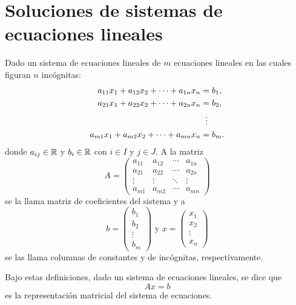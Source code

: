 \documentclass[a4,11pt]{aleph-notas}
\begin{document}
\encabezado

\section{Soluciones de sistemas de ecuaciones lineales}
\begin{defi}
    Dado un sistema de ecuaciones lineales de $m$ ecuaciones lineales en las cuales figuran $n$ incógnitas:
    \begin{align*}
        a_{11}x_1 + a_{12}x_2 + \cdots + a_{1n}x_n &= b_1,\\
        a_{21}x_1 + a_{22}x_2 + \cdots + a_{2n}x_n &= b_2,\\
            & \hspace{2mm} \vdots\\
        a_{m1}x_1 + a_{m2}x_2 + \cdots + a_{mn}x_n &= b_m.
    \end{align*}
    donde $a_{ij}\in\mathbb{R}$ y $b_i\in \mathbb{R}$ con $i\in I$ y $j\in J$. A la matriz
    \[
        A=\begin{pmatrix}
        a_{11} & a_{12} & \cdots & a_{1n}\\
        a_{21} & a_{22} & \cdots & a_{2n}\\
        \vdots & \vdots & \ddots & \vdots\\
        a_{m1} & a_{m2} & \cdots & a_{mn}
        \end{pmatrix}
    \]
    se la llama matriz de coeficientes del sistema y a 
    \[
        b=\begin{pmatrix}
        b_1 \\ b_2 \\ \vdots \\ b_m
        \end{pmatrix}
        \text{ y }
        x=\begin{pmatrix}
        x_1 \\ x_2 \\ \vdots \\ x_n
        \end{pmatrix}
    \]
    se las llama columnas de constantes y de incógnitas, respectivamente.
\end{defi}

\begin{advertencia}
    Bajo estas definiciones, dado un sistema de ecuaciones lineales, se dice que
    \[
        Ax=b
    \]
    es la representación matricial del sistema de ecuaciones.
\end{advertencia}
\end{document}
